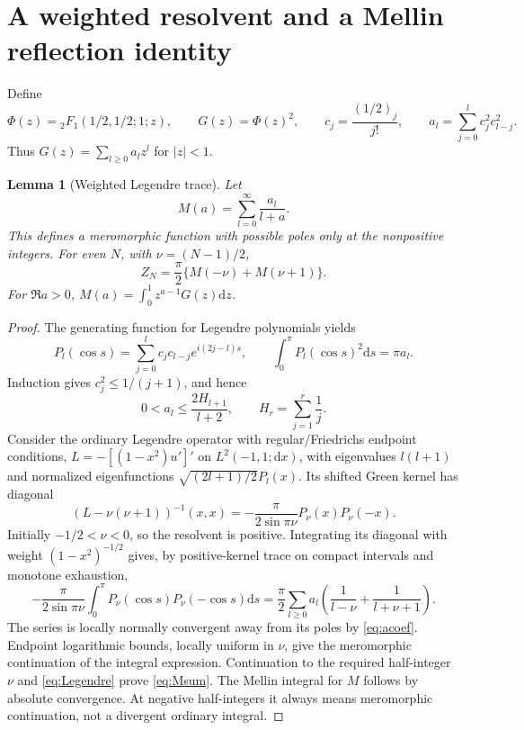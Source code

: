 \documentclass[10pt]{article}
\newtheorem{lemma}[theorem]{Lemma}
\newcommand{\dd}{\mathrm d}
\begin{document}
\section{A weighted resolvent and a Mellin reflection identity}
Define
\[
\Phi(z)={}_2F_1(1/2,1/2;1;z),\qquad G(z)=\Phi(z)^2,
\qquad c_j=\frac{(1/2)_j}{j!},\qquad
a_l=\sum_{j=0}^l c_j^2c_{l-j}^2.
\]
Thus $G(z)=\sum_{l\ge0}a_lz^l$ for $|z|<1$.
\begin{lemma}[Weighted Legendre trace]
Let
\[
M(a)=\sum_{l=0}^{\infty}\frac{a_l}{l+a}.
\]
This defines a meromorphic function with possible poles only at the
nonpositive integers. For even $N$, with $\nu=(N-1)/2$,
\begin{equation}
Z_N=\frac\pi2\{M(-\nu)+M(\nu+1)\}.
\label{eq:Msum}
\end{equation}
For $\Re a>0$, $M(a)=\int_0^1z^{a-1}G(z)\dd z$.
\end{lemma}
\begin{proof}
The generating function for Legendre polynomials yields
\[
P_l(\cos s)=\sum_{j=0}^l c_jc_{l-j}e^{i(2j-l)s},
\qquad \int_0^\pi P_l(\cos s)^2\dd s=\pi a_l.
\]
Induction gives $c_j^2\le1/(j+1)$, and hence
\begin{equation}
0<a_l\le\frac{2H_{l+1}}{l+2},\qquad
H_r=\sum_{j=1}^r\frac1j.
\label{eq:acoef}
\end{equation}
Consider the ordinary Legendre operator with regular/Friedrichs endpoint
conditions, $L=-[(1-x^2)u']'$ on $L^2(-1,1;\dd x)$, with eigenvalues $l(l+1)$
and normalized eigenfunctions $\sqrt{(2l+1)/2}P_l(x)$.
Its shifted Green kernel has diagonal
\[
(L-\nu(\nu+1))^{-1}(x,x)
=-\frac\pi{2\sin\pi\nu}P_\nu(x)P_\nu(-x).
\]
Initially $-1/2<\nu<0$, so the resolvent is positive.
Integrating its diagonal with weight $(1-x^2)^{-1/2}$ gives, by
positive-kernel trace on compact intervals and monotone exhaustion,
\[
-\frac\pi{2\sin\pi\nu}\int_0^\pi
P_\nu(\cos s)P_\nu(-\cos s)\dd s
=\frac\pi2\sum_{l\ge0}a_l
\left(\frac1{l-\nu}+\frac1{l+\nu+1}\right).
\]
The series is locally normally convergent away from its poles by
\eqref{eq:acoef}. Endpoint logarithmic bounds, locally uniform in
$\nu$, give the meromorphic continuation of the integral expression.
Continuation to the required half-integer $\nu$ and
\eqref{eq:Legendre} prove \eqref{eq:Msum}. The Mellin integral for
$M$ follows by absolute convergence. At negative half-integers it
always means meromorphic continuation, not a divergent ordinary integral.
\end{proof}
\end{document}
